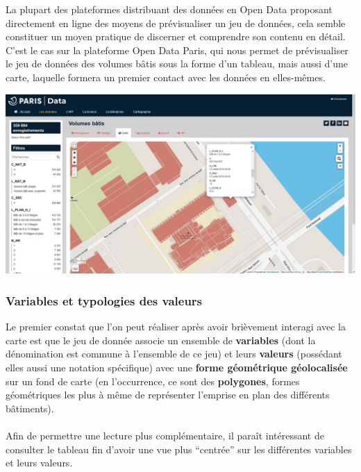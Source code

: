 \documentclass[
  11pt,
  french,
]{article}
\newcounter{customfigs}[section]
\newenvironment{customfigs}[1][] {
    \stepcounter{customfigs}
    Fig \arabic{section}. \arabic{customfigs} : }
\newcommand{\masked}{\vspace*{-\baselineskip}}
\begin{document}
La plupart des plateformes distribuant des données en Open Data
proposant directement en ligne des moyens de prévisualiser un jeu de
données, cela semble constituer un moyen pratique de discerner et
comprendre son contenu en détail. C'est le cas sur la plateforme Open
Data Paris, qui nous permet de prévisualiser le jeu de données des
volumes bâtis sous la forme d'un tableau, mais aussi d'une carte,
laquelle formera un premier contact avec les données en elles-mêmes.\\

\begin{tcolorbox}[title=\begin{customfigs} Prévisualisation cartographique du jeu de données des volumes bâtis. \end{customfigs}]

\begin{center}\includegraphics[width=1\linewidth]{__imgs/site_odp_carte} \end{center}

\end{tcolorbox}

\newpage

\hypertarget{variables-et-typologies-des-valeurs}{%
\subsubsection{Variables et typologies des
valeurs}\label{variables-et-typologies-des-valeurs}}

Le premier constat que l'on peut réaliser après avoir brièvement
interagi avec la carte est que le jeu de donnée associe un ensemble de
\textbf{variables} (dont la dénomination est commune à l'ensemble de ce
jeu) et leurs \textbf{valeurs} (possédant elles aussi une notation
spécifique) avec une \textbf{forme géométrique géolocalisée} sur un fond
de carte (en l'occurrence, ce sont des \textbf{polygones}, formes
géométriques les plus à même de représenter l'emprise en plan des
différents bâtiments).\\
~\\
Afin de permettre une lecture plus complémentaire, il paraît intéressant
de consulter le tableau fin d'avoir une vue plus ``centrée'' sur les
différentes variables et leurs valeurs.\\
\end{document}
